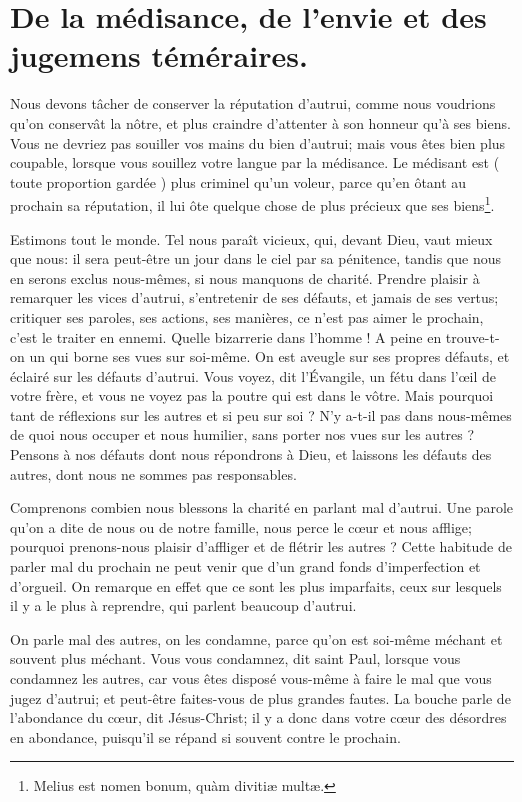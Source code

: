 \documentclass[instructions.tex]{subfiles}
\begin{document}
 
\chapter{De la médisance, de l’envie et des jugemens téméraires.}
 
\primo Nous devons tâcher de conserver la réputation d’autrui, comme nous voudrions qu’on conservât la nôtre, et plus craindre d’attenter à son honneur qu’à ses biens. Vous ne devriez pas souiller vos mains du bien d’autrui; mais vous êtes bien plus coupable, lorsque vous souillez votre langue par la médisance. Le médisant est ( toute proportion gardée ) plus criminel qu’un voleur, parce qu’en ôtant au prochain sa réputation, il lui ôte quelque chose de plus précieux que ses biens\footnote{Melius est nomen bonum, quàm divitiæ multæ.}.
 
Estimons tout le monde. Tel nous paraît vicieux, qui, devant Dieu, vaut mieux que nous: il sera peut-être un jour dans le ciel par sa pénitence, tandis que nous en serons exclus nous-mêmes, si nous manquons de charité. Prendre plaisir à remarquer les vices d’autrui, s’entretenir de ses défauts, et jamais de ses vertus; critiquer ses paroles, ses actions, ses manières, ce n’est pas aimer le prochain, c’est le traiter en ennemi. Quelle bizarrerie dans l’homme ! A peine en trouve-t-on un qui borne ses vues sur soi-même. On est aveugle sur ses propres défauts, et éclairé sur les défauts d’autrui. Vous voyez, dit l’Évangile, un fétu dans l’œil de votre frère, et vous ne voyez pas la poutre qui est dans le vôtre. Mais pourquoi tant de réflexions sur les autres et si peu sur soi ? N’y a-t-il pas dans nous-mêmes de quoi nous occuper et nous humilier, sans porter nos vues sur les autres ? Pensons à nos défauts dont nous répondrons à Dieu, et laissons les défauts des autres, dont nous ne sommes pas responsables.
 
Comprenons combien nous blessons la charité en parlant mal d’autrui. Une parole qu’on a dite de nous ou de notre famille, nous perce le cœur et nous afflige; pourquoi prenons-nous plaisir d’affliger et de flétrir les autres ? Cette habitude de parler mal du prochain ne peut venir que d’un grand fonds d’imperfection et d’orgueil. On remarque en effet que ce sont les plus imparfaits, ceux sur lesquels il y a le plus à reprendre, qui parlent beaucoup d’autrui.
 
On parle mal des autres, on les condamne, parce qu’on est soi-même méchant et souvent plus méchant. Vous vous condamnez, dit saint Paul, lorsque vous condamnez les autres, car vous êtes disposé vous-même à faire le mal que vous jugez d’autrui; et peut-être faites-vous de plus grandes fautes. La bouche parle de l’abondance du cœur, dit Jésus-Christ; il y a donc dans votre cœur des désordres en abondance, puisqu’il se répand si souvent contre le prochain.
 
\end{document}
